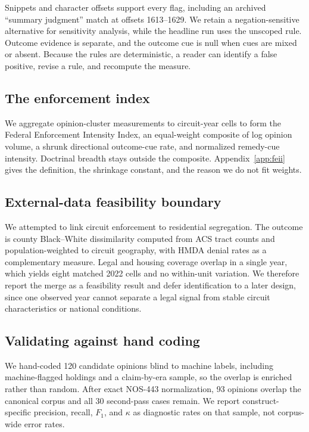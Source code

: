 \documentclass[11pt]{article}
\begin{document}
Snippets and character offsets support every flag, including an archived ``summary judgment'' match at offsets 1613--1629. We retain a negation-sensitive alternative for sensitivity analysis, while the headline run uses the unscoped rule. Outcome evidence is separate, and the outcome cue is null when cues are mixed or absent. Because the rules are deterministic, a reader can identify a false positive, revise a rule, and recompute the measure.

\subsection{The enforcement index}

We aggregate opinion-cluster measurements to circuit-year cells to form the Federal Enforcement Intensity Index, an equal-weight composite of log opinion volume, a shrunk directional outcome-cue rate, and normalized remedy-cue intensity. Doctrinal breadth stays outside the composite. Appendix~\ref{app:feii} gives the definition, the shrinkage constant, and the reason we do not fit weights.

\subsection{External-data feasibility boundary}\label{sec:feasibility}

We attempted to link circuit enforcement to residential segregation. The outcome is county Black--White dissimilarity \citep{massey1988} computed from ACS tract counts \citep{census2022} and population-weighted to circuit geography, with HMDA denial rates \citep{cfpb2024} as a complementary measure. Legal and housing coverage overlap in a single year, which yields eight matched 2022 cells and no within-unit variation. We therefore report the merge as a feasibility result and defer identification to a later design, since one observed year cannot separate a legal signal from stable circuit characteristics or national conditions.

\subsection{Validating against hand coding}\label{sec:validation}

We hand-coded 120 candidate opinions blind to machine labels, including machine-flagged holdings and a claim-by-era sample, so the overlap is enriched rather than random. After exact NOS-443 normalization, 93 opinions overlap the canonical corpus and all 30 second-pass cases remain. We report construct-specific precision, recall, $F_1$, and $\kappa$ as diagnostic rates on that sample, not corpus-wide error rates.
\end{document}

